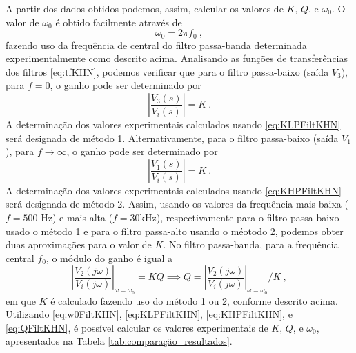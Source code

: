 A partir dos dados obtidos podemos, assim, calcular os valores de $K$, $Q$, e $\omega_0$. O valor de $\omega_0$ é obtido facilmente através de 
\begin{equation}\label{eq:w0FiltKHN}
\omega_0 = 2\pi f_0\:,   
\end{equation}
fazendo uso da frequência de central do filtro passa-banda determinada experimentalmente como descrito acima.  Analisando as funções de transferências dos filtros \eqref{eq:tfKHN}, podemos verificar que para o filtro passa-baixo (saída $V_3$), para $f=0$, o ganho pode ser determinado por
\begin{equation}\label{eq:KLPFiltKHN}
    \left|\frac{V_3 (s)}{V_i (s)}\right| = K \:.
\end{equation}
A determinação dos valores experimentais calculados usando \eqref{eq:KLPFiltKHN} será designada de método 1. Alternativamente, para o filtro passa-baixo (saída $V_1$), para $f\rightarrow \infty$,
 o ganho pode ser determinado por
\begin{equation}\label{eq:KHPFiltKHN}
     \left|\frac{V_1(s)}{V_i (s)}\right| = K \:.
\end{equation}
A determinação dos valores experimentais calculados usando \eqref{eq:KHPFiltKHN} será designada de método 2.
Assim, usando os valores da frequência mais baixa ($f= 500$ Hz) e mais alta ($f = 30$kHz), respectivamente para o filtro passa-baixo usado o método 1 e para o filtro passa-alto usando o méotodo 2, podemos obter duas aproximações para o valor de $K$. No filtro passa-banda, para a frequência central $f_0$, o módulo do ganho é igual a 
\begin{equation}\label{eq:QFiltKHN}
    \left|\frac{V_2 (j\omega)}{V_i (j\omega)}\right|_{\omega = \omega_0} = KQ \implies Q =  \left|\frac{V_2 (j\omega)}{V_i (j\omega)}\right|_{\omega = \omega_0}/K\:,
\end{equation}
em que $K$ é calculado fazendo uso do método 1 ou 2, conforme descrito acima.
Utilizando \eqref{eq:w0FiltKHN}, \eqref{eq:KLPFiltKHN}, \eqref{eq:KHPFiltKHN}, e \eqref{eq:QFiltKHN}, é possível calcular os valores experimentais de $K$, $Q$, e $\omega_0$, apresentados na Tabela \ref{tab:comparação_resultados}.

